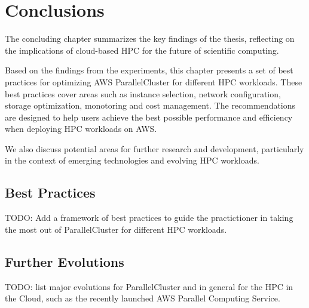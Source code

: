 \chapter{Conclusions}

The concluding chapter summarizes the key findings of the thesis, reflecting on the implications of
cloud-based HPC for the future of scientific computing.

Based on the findings from the experiments, this chapter presents a set of best practices for optimizing AWS
ParallelCluster for different HPC workloads.
These best practices cover areas such as instance selection, network configuration, storage optimization,
monotoring and cost management.
The recommendations are designed to help users achieve the best possible performance and efficiency when
deploying HPC workloads on AWS.

We also discuss potential areas for further research and development, particularly in the context of emerging
technologies and evolving HPC workloads.

\section{Best Practices}
\label{sec:best-practices}

TODO: Add a framework of best practices to guide the practictioner in taking the most out of ParallelCluster
for different HPC workloads.

\section{Further Evolutions}
\label{sec:further-evolutions}

TODO: list major evolutions for ParallelCluster and in general for the HPC in the Cloud, such as the recently
launched AWS Parallel Computing Service.
